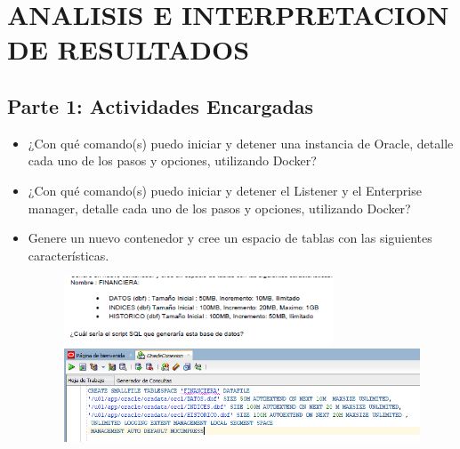 \section{ANALISIS E INTERPRETACION DE RESULTADOS} 


\subsection{Parte 1: Actividades Encargadas}
	\begin{itemize}
		\item ¿Con qué comando(s) puedo iniciar y detener una instancia de Oracle, detalle cada uno de los pasos y opciones,
utilizando Docker?
		\item ¿Con qué comando(s) puedo iniciar y detener el Listener y el Enterprise manager, detalle cada uno de los pasos y
opciones, utilizando Docker?
		\item Genere un nuevo contenedor y cree un espacio de tablas con las siguientes características.
		\begin{figure}[H]
		\begin{center}
		\includegraphics[width=8cm]{./Imagenes/t3}
		\includegraphics[width=15cm]{./Imagenes/23}
		\end{center}
		\end{figure}


	\end{itemize}



